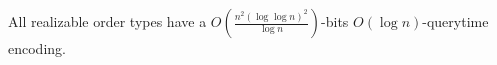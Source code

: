 \begin{contribution}[label=thm:realizable,restate=TheoremGPTRealizable]
  All realizable order types have a
  \(O(\frac{n^2 {(\log \log n)}^2}{\log n})\)-bits
  \(O(\log n)\)-querytime encoding.
\end{contribution}
